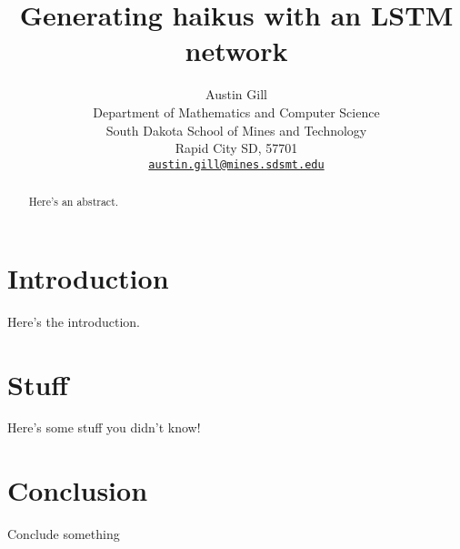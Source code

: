 \documentclass[letterpaper]{article}
\title{Generating haikus with an LSTM network}
\author{
    Austin Gill\\
    Department of Mathematics and Computer Science\\
    South Dakota School of Mines and Technology\\
    Rapid City SD, 57701\\
    \texttt{\href{mailto:austin.gill@mines.sdsmt.edu}{austin.gill@mines.sdsmt.edu}} \\
}
\begin{document}
\maketitle

\begin{abstract}
    Here's an abstract.
\end{abstract}

\section{Introduction}
    Here's the introduction.

\section{Stuff}
    Here's some stuff you didn't know!

\section{Conclusion}
    Conclude something
\end{document}
